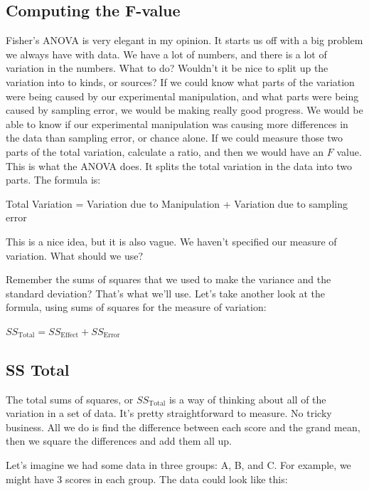 \documentclass[
]{book}
\begin{document}
\subsection{Computing the F-value}\label{computing-the-f-value}

Fisher's ANOVA is very elegant in my opinion. It starts us off with a big problem we always have with data. We have a lot of numbers, and there is a lot of variation in the numbers. What to do? Wouldn't it be nice to split up the variation into to kinds, or sources? If we could know what parts of the variation were being caused by our experimental manipulation, and what parts were being caused by sampling error, we would be making really good progress. We would be able to know if our experimental manipulation was causing more differences in the data than sampling error, or chance alone. If we could measure those two parts of the total variation, calculate a ratio, and then we would have an \(F\) value. This is what the ANOVA does. It splits the total variation in the data into two parts. The formula is:

Total Variation = Variation due to Manipulation + Variation due to sampling error

This is a nice idea, but it is also vague. We haven't specified our measure of variation. What should we use?

Remember the sums of squares that we used to make the variance and the standard deviation? That's what we'll use. Let's take another look at the formula, using sums of squares for the measure of variation:

\(SS_\text{Total} = SS_\text{Effect} + SS_\text{Error}\)

\subsection{SS Total}\label{ss-total}

The total sums of squares, or \(SS_\text{Total}\) is a way of thinking about all of the variation in a set of data. It's pretty straightforward to measure. No tricky business. All we do is find the difference between each score and the grand mean, then we square the differences and add them all up.

Let's imagine we had some data in three groups: A, B, and C. For example, we might have 3 scores in each group. The data could look like this:
\end{document}
